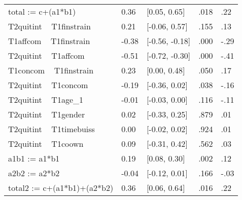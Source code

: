 \begin{table}[ht]
\begin{tabular}{lllll}
  total := c+(a1*b1) & 0.36 & [0.05, 0.65] & .018 & .22 \\ 
  T2quitint ~ T1finstrain & 0.21 & [-0.06, 0.57] & .155 & .13 \\ 
  T1affcom ~ T1finstrain & -0.38 & [-0.56, -0.18] & .000 & -.29 \\ 
  T2quitint ~ T1affcom & -0.51 & [-0.72, -0.30] & .000 & -.41 \\ 
  T1concom ~ T1finstrain & 0.23 & [0.00, 0.48] & .050 & .17 \\ 
  T2quitint ~ T1concom & -0.19 & [-0.36, 0.02] & .038 & -.16 \\ 
  T2quitint ~ T1age_1 & -0.01 & [-0.03, 0.00] & .116 & -.11 \\ 
  T2quitint ~ T1gender & 0.02 & [-0.33, 0.25] & .879 & .01 \\ 
  T2quitint ~ T1timebuiss & 0.00 & [-0.02, 0.02] & .924 & .01 \\ 
  T2quitint ~ T1coown & 0.09 & [-0.31, 0.42] & .562 & .03 \\ 
  a1b1 := a1*b1 & 0.19 & [0.08, 0.30] & .002 & .12 \\ 
  a2b2 := a2*b2 & -0.04 & [-0.12, 0.01] & .166 & -.03 \\ 
  total2 := c+(a1*b1)+(a2*b2) & 0.36 & [0.06, 0.64] & .016 & .22 \\ 
   \hline
\end{tabular}
\end{table}
